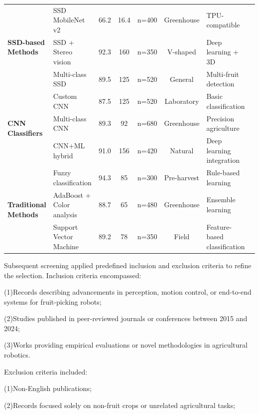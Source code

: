 \documentclass{ieeeaccess}
\begin{document}
\begin{table}[ht]
\begin{tabularx}{\textwidth}{l X c c c c X X}
\multirow{3}{*}{\textbf{SSD-based Methods}} 
& SSD MobileNet v2 & 66.2 & 16.4 & n=400 & Greenhouse & TPU-compatible & \cite{magalhaes2021evaluating} \\
& SSD + Stereo vision & 92.3 & 160 & n=350 & V-shaped & Deep learning + 3D & \cite{onishi2019automated} \\
& Multi-class SSD & 89.5 & 125 & n=520 & General & Multi-fruit detection & \cite{peng2018general} \\ \midrule

\multirow{3}{*}{\textbf{CNN Classifiers}} 
& Custom CNN & 87.5 & 125 & n=520 & Laboratory & Basic classification & \cite{hameed2018comprehensive} \\
& Multi-class CNN & 89.3 & 92 & n=680 & Greenhouse & Precision agriculture & \cite{mavridou2019machine} \\
& CNN+ML hybrid & 91.0 & 156 & n=420 & Natural & Deep learning integration & \cite{saleem2021automation} \\ \midrule

\multirow{3}{*}{\textbf{Traditional Methods}} 
& Fuzzy classification & 94.3 & 85 & n=300 & Pre-harvest & Rule-based learning & \cite{goel2015fuzzy} \\
& AdaBoost + Color analysis & 88.7 & 65 & n=480 & Greenhouse & Ensemble learning & \cite{zhao2016detecting} \\
& Support Vector Machine & 89.2 & 78 & n=350 & Field & Feature-based classification & \cite{wei2014automatic} \\

\bottomrule
\end{tabularx}
\end{table}

Subsequent screening applied predefined inclusion and exclusion criteria to refine the selection. Inclusion criteria encompassed:

(1)Records describing advancements in perception, motion control, or end-to-end systems for fruit-picking robots;

(2)Studies published in peer-reviewed journals or conferences between 2015 and 2024;

(3)Works providing empirical evaluations or novel methodologies in agricultural robotics.

Exclusion criteria included:

(1)Non-English publications;

(2)Records focused solely on non-fruit crops or unrelated agricultural tasks;
\end{document}
